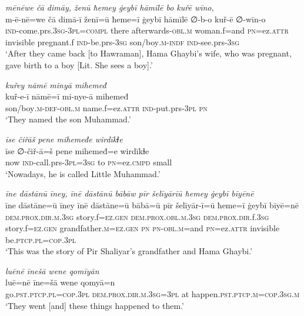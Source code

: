 \ea \label{BP.205}
\textit{mēnēwe čā dimāy, ženū ħemey ġeybī hāmīlē bo kuřē wīno,} \\ 
\gll m-ē-nē=we čā dimā-ī ženī=ū ħeme=ī ġeybī hāmīlē ∅-b-o kuř-ē ∅-wīn-o \\ 
 \textsc{ind-}come.prs\textsc{.3sg}\textsc{-3pl}\textsc{=compl} there afterwards\textsc{-obl}\textsc{.m} woman.f=and \textsc{pn}=ez.\textsc{attr} invisible pregnant.f \textsc{ind-}be.prs\textsc{-3sg} son/boy\textsc{.m}\textsc{-indf} \textsc{ind-}see.prs\textsc{-3sg} \\ 
\glt `After they came back [to Hawraman], Hama Ghaybi’s wife, who was pregnant, gave birth to a boy [Lit. She sees a boy].'
\z 
 
\ea \label{BP.206}
\textit{kuřey nāmē minyā mihemeđ} \\ 
\gll kuř-e-ī nāmē=ī mi-nye-ā mihemeđ \\ 
 son/boy\textsc{.m}\textsc{-def}\textsc{-obl}\textsc{.m} name.f=ez.\textsc{attr} \textsc{ind-}put.prs\textsc{-3pl} \textsc{pn} \\ 
\glt `They named the son Muhammad.'
\z 
 
\ea \label{BP.207}
\textit{īse čiřāš pene mihemeđe wirdīkɫe} \\ 
\gll īse ∅-čiř-ā=š pene mihemeđ=e wirdīkɫe \\ 
 now \textsc{ind-}call.prs\textsc{-3pl}\textsc{=3sg} to \textsc{pn}=ez\textsc{.cmpd} small \\ 
\glt `Nowadays, he is called Little  Muhammad.'
\z 
 
\ea \label{BP.208}
\textit{īne dāstānū īney, īnē dāstānū bābāw pīr šelīyārīū ħemey ġeybī bīyēnē} \\ 
\gll īne dāstāne=ū īney īnē dāstāne=ū bābā=ū pīr šelīyār-ī=ū ħeme=ī ġeybī bīyē=nē \\ 
 \textsc{dem.prox}\textsc{.dir}\textsc{.m}\textsc{.3sg} story.f\textsc{=ez.gen} \textsc{dem.prox}\textsc{.obl}\textsc{.m}\textsc{.3sg} \textsc{dem.prox}\textsc{.dir}.f\textsc{.3sg} story.f\textsc{=ez.gen} grandfather\textsc{.m}\textsc{=ez.gen} \textsc{pn} \textsc{pn}\textsc{-obl}\textsc{.m}=and \textsc{pn}=ez.\textsc{attr} invisible be\textsc{.ptcp}\textsc{.pl}\textsc{=cop}\textsc{.3pl} \\ 
\glt `This was the story of Pir Shaliyar’s grandfather and Hama Ghaybi.'
\z 
 
\ea \label{BP.209}
\textit{luēnē īnešā wene qomīyān} \\ 
\gll luē=nē īne=šā wene qomyā=n \\ 
 go\textsc{.pst}\textsc{.ptcp}\textsc{.pl}\textsc{=cop}\textsc{.3pl} \textsc{dem.prox}\textsc{.dir}\textsc{.m}\textsc{.3sg}\textsc{=3pl} at happen\textsc{.pst}\textsc{.ptcp}\textsc{.m}\textsc{=cop}\textsc{.3sg}\textsc{.m} \\ 
\glt `They went [and] these things happened to them.'
\z 
 
